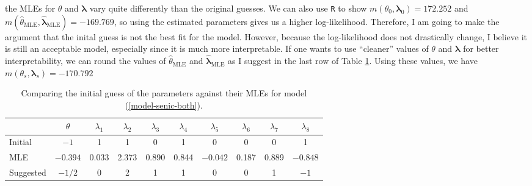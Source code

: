 \documentclass[10pt]{article}
\begin{document}
\begin{itemize}
    the MLEs for \(\theta\) and \(\bm{\lambda}\) vary quite differently than the original guesses. We can also use \texttt{R} to show \(m(\theta_0, \bm{\lambda}_0) = 172.252\)
    and \(m(\hat{\theta}_{\mathrm{MLE}}, \hat{\bm{\lambda}}_{\mathrm{MLE}}) = -169.769\), so using the estimated parameters gives us a higher log-likelihood. 
    Therefore, I am going to make the argument that the inital guess is not the best fit for the model. 
    However, because the log-likelihood does not drastically change, I believe it is still an acceptable model, especially since it is much more interpretable. 
    If one wants to use ``cleaner'' values of \(\theta\) and \(\bm{\lambda}\) for better interpretability, 
    we can round the values of \(\hat{\theta}_{\mathrm{MLE}}\) and \(\hat{\bm{\lambda}}_{\mathrm{MLE}}\) as I suggest in the last row of Table \ref{table-pars-comp}.
    Using these values, we have \(m(\theta_s, \bm{\lambda}_s) = -170.792\)
    \begin{table}[ht]
        \centering
        \def\arraystretch{1.25}
        \begin{tabular}{|l|c|cccccccc|}
            \hline%
            & \(\theta\) & \(\lambda_1\) & \(\lambda_2\) & \(\lambda_3\) & \(\lambda_4\) & \(\lambda_5\) & \(\lambda_6\) & \(\lambda_7\) & \(\lambda_8\) \\
            \hline%
            Initial & \(-1\) & 1 & 1 & 0 & 1 & 0 & 0 & 0 & 1 \\
            MLE & \(-0.394\) & 0.033 & 2.373 & 0.890 & 0.844 & \(-0.042\) & 0.187 & 0.889 & \(-0.848\) \\
            Suggested & \(-1/2\) & 0 & 2 & 1 & 1 & 0 & 0 & 1 & \(-1\) \\
            \hline%
        \end{tabular}
        \caption{Comparing the initial guess of the parameters against their MLEs for model (\ref{model-senic-both}).}
        \label{table-pars-comp}
    \end{table}


\end{itemize}
\end{document}
